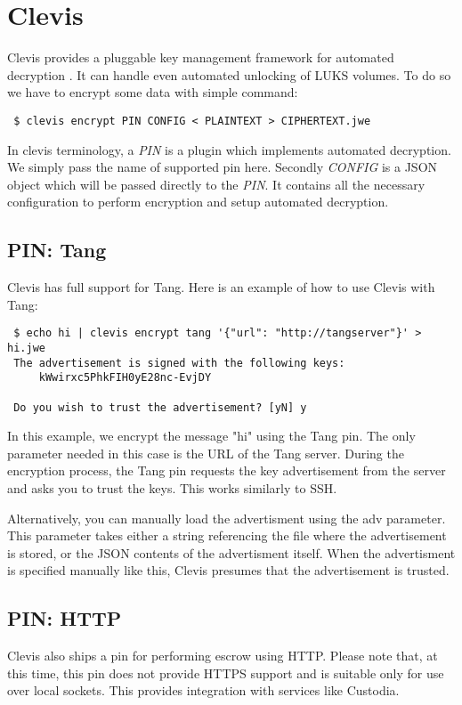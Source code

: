 \documentclass[../xdudla00-porting-Tang-to-Open-WRT.tex]{subfiles}
\begin{document}
\chapter{Clevis}\label{clevis}

Clevis provides a pluggable key management framework for automated decryption \cite{clevis}.
It can handle even automated unlocking of LUKS volumes.
To do so we have to encrypt some data with simple command:

{\tt\begin{verbatim} $ clevis encrypt PIN CONFIG < PLAINTEXT > CIPHERTEXT.jwe\end{verbatim}
}
In clevis terminology, a {\it PIN} is a plugin which implements automated decryption.
We simply pass the name of supported pin here.
Secondly {\it CONFIG} is a JSON object which will be passed directly to the {\it PIN}.
It contains all the necessary configuration to perform encryption and setup automated decryption.

\section{PIN: Tang}
Clevis has full support for Tang. Here is an example of how to use Clevis with Tang:
{\tt \begin{verbatim} $ echo hi | clevis encrypt tang '{"url": "http://tangserver"}' > hi.jwe
 The advertisement is signed with the following keys:
     kWwirxc5PhkFIH0yE28nc-EvjDY

 Do you wish to trust the advertisement? [yN] y\end{verbatim}
}
In this example, we encrypt the message "hi" using the Tang pin.
The only parameter needed in this case is the URL of the Tang server.
During the encryption process, the Tang pin requests the key advertisement from the server and asks you to trust the keys.
This works similarly to SSH.

Alternatively, you can manually load the advertisment using the adv parameter.
This parameter takes either a string referencing the file where the advertisement is stored, or the JSON contents of the advertisment itself.
When the advertisment is specified manually like this, Clevis presumes that the advertisement is trusted.
\section{PIN: HTTP}
Clevis also ships a pin for performing escrow using HTTP.
Please note that, at this time, this pin does not provide HTTPS support and is suitable only for use over local sockets.
This provides integration with services like Custodia.
\end{document}
